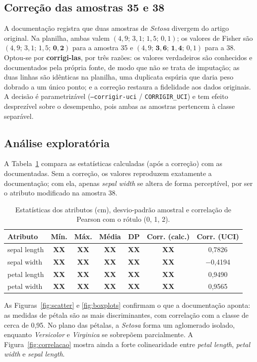 \documentclass[12pt,a4paper]{article}
\newcommand{\XN}{\textbf{XX}}
\newcommand{\TabelaEstatisticas}{%
sepal length & \XN & \XN & \XN & \XN & \XN & 0,7826 \\
sepal width  & \XN & \XN & \XN & \XN & \XN & $-$0,4194 \\
petal length & \XN & \XN & \XN & \XN & \XN & 0,9490 \\
petal width  & \XN & \XN & \XN & \XN & \XN & 0,9565 \\}
\begin{document}
\subsection{Correção das amostras 35 e 38}

A documentação registra que duas amostras de \textit{Setosa} divergem do artigo original. Na
planilha, ambas valem $(4{,}9;\,3{,}1;\,1{,}5;\,0{,}1)$; os valores de Fisher são
$(4{,}9;\,3{,}1;\,1{,}5;\,\mathbf{0{,}2})$ para a amostra 35 e $(4{,}9;\,\mathbf{3{,}6};\,\mathbf{1{,}4};\,0{,}1)$
para a 38. Optou-se por \textbf{corrigi-las}, por três razões: os valores verdadeiros são conhecidos e
documentados pela própria fonte, de modo que não se trata de imputação; as duas linhas são idênticas
na planilha, uma duplicata espúria que daria peso dobrado a um único ponto; e a correção restaura a
fidelidade aos dados originais. A decisão é parametrizável (\texttt{--corrigir-uci} /
\texttt{CORRIGIR\_UCI}) e tem efeito desprezível sobre o desempenho, pois ambas as amostras pertencem
à classe separável.

\subsection{Análise exploratória}

A Tabela~\ref{tab:estatisticas} compara as estatísticas calculadas (após a correção) com as
documentadas. Sem a correção, os valores reproduzem exatamente a documentação; com ela, apenas
\textit{sepal width} se altera de forma perceptível, por ser o atributo modificado na amostra 38.

\begin{table}[H]
  \centering
  \caption{Estatísticas dos atributos (cm), desvio-padrão amostral e correlação de Pearson com o
  rótulo (0, 1, 2).}
  \label{tab:estatisticas}
  \small
  \begin{tabular}{lcccccc}
    \toprule
    Atributo & Mín. & Máx. & Média & DP & Corr. (calc.) & Corr. (UCI) \\
    \midrule
    \TabelaEstatisticas
    \bottomrule
  \end{tabular}
\end{table}

As Figuras~\ref{fig:scatter} e \ref{fig:boxplots} confirmam o que a documentação aponta: as medidas
de pétala são as mais discriminantes, com correlação com a classe de cerca de 0,95. No plano das
pétalas, a \textit{Setosa} forma um aglomerado isolado, enquanto \textit{Versicolor} e
\textit{Virginica} se sobrepõem parcialmente. A Figura~\ref{fig:correlacao} mostra ainda a forte
colinearidade entre \textit{petal length}, \textit{petal width} e \textit{sepal length}.
\end{document}
